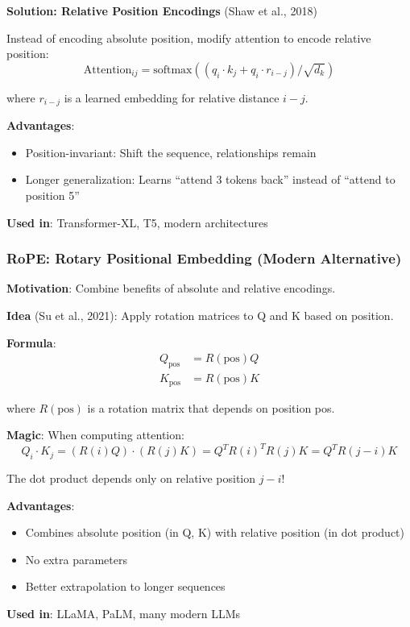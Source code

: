 \textbf{Solution: Relative Position Encodings} (Shaw et al., 2018)

Instead of encoding absolute position, modify attention to encode relative position:
\[
\text{Attention}_{ij} = \text{softmax}((q_i \cdot k_j + q_i \cdot r_{i-j}) / \sqrt{d_k})
\]

where $r_{i-j}$ is a learned embedding for relative distance $i-j$.

\textbf{Advantages}:
\begin{itemize}
\item Position-invariant: Shift the sequence, relationships remain
\item Longer generalization: Learns ``attend 3 tokens back'' instead of ``attend to position 5''
\end{itemize}

\textbf{Used in}: Transformer-XL, T5, modern architectures

\subsubsection{RoPE: Rotary Positional Embedding (Modern Alternative)}

\textbf{Motivation}: Combine benefits of absolute and relative encodings.

\textbf{Idea} (Su et al., 2021): Apply rotation matrices to Q and K based on position.

\textbf{Formula}:
\begin{align*}
Q_{\text{pos}} &= R(\text{pos}) Q \\
K_{\text{pos}} &= R(\text{pos}) K
\end{align*}

where $R(\text{pos})$ is a rotation matrix that depends on position pos.

\textbf{Magic}: When computing attention:
\[
Q_i \cdot K_j = (R(i)Q) \cdot (R(j)K) = Q^T R(i)^T R(j) K = Q^T R(j-i) K
\]

The dot product depends only on relative position $j-i$!

\textbf{Advantages}:
\begin{itemize}
\item Combines absolute position (in Q, K) with relative position (in dot product)
\item No extra parameters
\item Better extrapolation to longer sequences
\end{itemize}

\textbf{Used in}: LLaMA, PaLM, many modern LLMs

